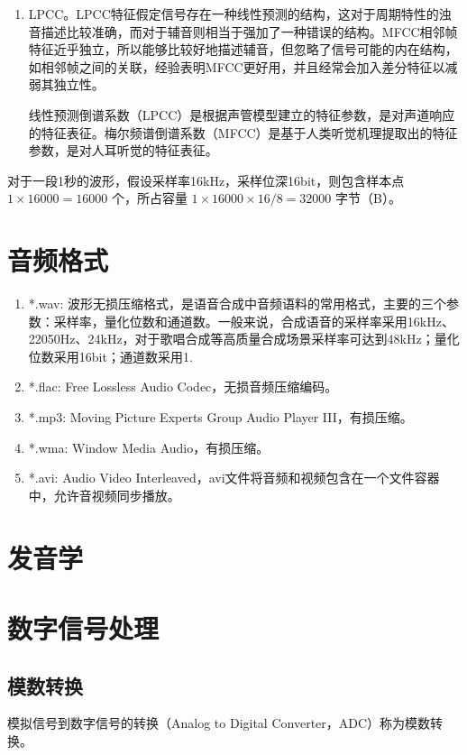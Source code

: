 \documentclass[cn,10pt,math=newtx,citestyle=gb7714-2015,bibstyle=gb7714-2015]{elegantbook}
\begin{document}
\begin{enumerate}
  \item LPCC。LPCC特征假定信号存在一种线性预测的结构，这对于周期特性的浊音描述比较准确，而对于辅音则相当于强加了一种错误的结构。MFCC相邻帧特征近乎独立，所以能够比较好地描述辅音，但忽略了信号可能的内在结构，如相邻帧之间的关联，经验表明MFCC更好用，并且经常会加入差分特征以减弱其独立性。
  \begin{note}
    线性预测倒谱系数（LPCC）是根据声管模型建立的特征参数，是对声道响应的特征表征。梅尔频谱倒谱系数（MFCC）是基于人类听觉机理提取出的特征参数，是对人耳听觉的特征表征。
  \end{note}
\end{enumerate}

对于一段1秒的波形，假设采样率16kHz，采样位深16bit，则包含样本点 $1\times 16000=16000$ 个，所占容量 $1\times 16000\times 16 /8=32000$ 字节（B）。

\section{音频格式}
\begin{enumerate}
  \item *.wav: 波形无损压缩格式，是语音合成中音频语料的常用格式，主要的三个参数：采样率，量化位数和通道数。一般来说，合成语音的采样率采用16kHz、22050Hz、24kHz，对于歌唱合成等高质量合成场景采样率可达到48kHz；量化位数采用16bit；通道数采用1.
  \item *.flac: Free Lossless Audio Codec，无损音频压缩编码。
  \item *.mp3: Moving Picture Experts Group Audio Player III，有损压缩。
  \item *.wma: Window Media Audio，有损压缩。
  \item *.avi: Audio Video Interleaved，avi文件将音频和视频包含在一个文件容器中，允许音视频同步播放。
\end{enumerate}

\section{发音学}

\section{数字信号处理}
\subsection{模数转换}

模拟信号到数字信号的转换（Analog to Digital Converter，ADC）称为模数转换。
\end{document}
